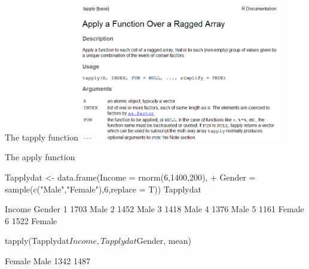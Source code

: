 \documentclass[11pt,german,hideothersubsections]{beamer}
\begin{document}
\begin{frame}[fragile]{The tapply function}
\includegraphics[width=\textwidth, height=6cm]{../../../tutorial/figure/FunctionTapply.PNG}
\end{frame}
\begin{frame}[fragile]{The apply function}
\footnotesize{
\begin{Schunk}
\begin{Sinput}
 Tapplydat <- data.frame(Income = rnorm(6,1400,200),
+                    Gender = sample(c("Male","Female"),6,replace = T))
 Tapplydat
\end{Sinput}
\begin{Soutput}
  Income Gender
1   1703   Male
2   1452   Male
3   1418   Male
4   1376   Male
5   1161 Female
6   1522 Female
\end{Soutput}
\begin{Sinput}
 tapply(Tapplydat$Income, Tapplydat$Gender, mean)
\end{Sinput}
\begin{Soutput}
Female   Male 
  1342   1487 
\end{Soutput}
\end{Schunk}
}
\end{frame}
\end{document}
